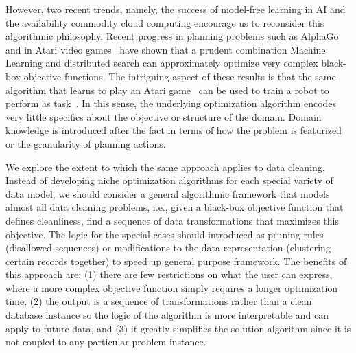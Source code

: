 However, two recent trends, namely, the success of model-free learning in AI and the availability commodity cloud computing encourage us to reconsider this algorithmic philosophy.
Recent progress in planning problems such as AlphaGo~\cite{silver2016mastering} and in Atari video games~\cite{mnih2015human} have shown that a prudent combination Machine Learning and distributed search can approximately optimize very complex black-box objective functions.
The intriguing aspect of these results is that the same algorithm that learns to play an Atari game~\cite{mnih2015human} can be used to train a robot to perform as task~\cite{gu2017deep}.
In this sense, the underlying optimization algorithm encodes very little specifics about the objective or structure of the domain.
Domain knowledge is introduced after the fact in terms of how the problem is featurized or the granularity of planning actions.

We explore the extent to which the same approach applies to data cleaning.
Instead of developing niche optimization algorithms for each special variety of data model, we should consider a general algorithmic framework that models almost all data cleaning problems, i.e., given a black-box objective function that defines cleanliness, find a sequence of data transformations that maximizes this objective.
The logic for the special cases should introduced as pruning rules (disallowed sequences) or modifications to the data representation (clustering certain records together) to speed up general purpose framework.
The benefits of this approach are: (1) there are few restrictions on what the user can express, where a more complex objective function simply requires a longer optimization time, (2) the output is a sequence of transformations rather than a clean database instance so the logic of the algorithm is more interpretable and can apply to future data, and (3) it greatly simplifies the solution algorithm since it is not coupled to any particular problem instance.

